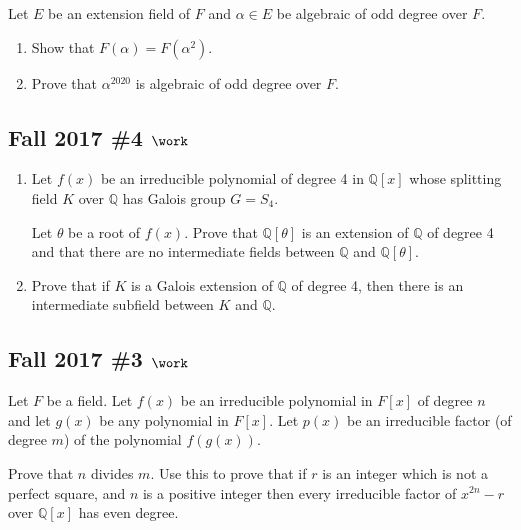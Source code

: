 Let \(E\) be an extension field of \(F\) and \(\alpha\in E\) be
algebraic of odd degree over \(F\).

\begin{enumerate}
\def\labelenumi{\alph{enumi}.}
\item
  Show that \(F(\alpha) = F(\alpha^2)\).
\item
  Prove that \(\alpha^{2020}\) is algebraic of odd degree over \(F\).
\end{enumerate}

\hypertarget{fall-2017-4-work}{%
\subsection{\texorpdfstring{Fall 2017 \#4
\(\work\)}{Fall 2017 \#4 \textbackslash work}}\label{fall-2017-4-work}}

\begin{enumerate}
\def\labelenumi{\alph{enumi}.}
\item
  Let \(f (x)\) be an irreducible polynomial of degree 4 in
  \({\mathbb{Q}}[x]\) whose splitting field \(K\) over \({\mathbb{Q}}\)
  has Galois group \(G = S_4\).

  Let \(\theta\) be a root of \(f(x)\). Prove that
  \({\mathbb{Q}}[\theta]\) is an extension of \({\mathbb{Q}}\) of degree
  4 and that there are no intermediate fields between \({\mathbb{Q}}\)
  and \({\mathbb{Q}}[\theta]\).
\item
  Prove that if \(K\) is a Galois extension of \({\mathbb{Q}}\) of
  degree 4, then there is an intermediate subfield between \(K\) and
  \({\mathbb{Q}}\).
\end{enumerate}

\hypertarget{fall-2017-3-work}{%
\subsection{\texorpdfstring{Fall 2017 \#3
\(\work\)}{Fall 2017 \#3 \textbackslash work}}\label{fall-2017-3-work}}

Let \(F\) be a field. Let \(f(x)\) be an irreducible polynomial in
\(F[x]\) of degree \(n\) and let \(g(x)\) be any polynomial in \(F[x]\).
Let \(p(x)\) be an irreducible factor (of degree \(m\)) of the
polynomial \(f(g(x))\).

Prove that \(n\) divides \(m\). Use this to prove that if \(r\) is an
integer which is not a perfect square, and \(n\) is a positive integer
then every irreducible factor of \(x^{2n} - r\) over \({\mathbb{Q}}[x]\)
has even degree.

